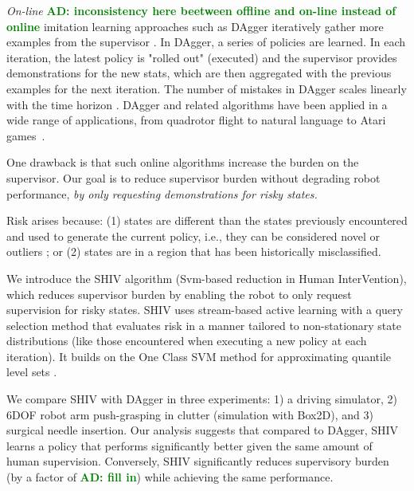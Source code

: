 \documentclass[10pt, conference]{ieeeconf}      %
\newcommand{\adnote}[1]{\ifthenelse{\boolean{include-notes}}%
 {\textcolor{green}{\textbf{AD: #1}}}{}}
\begin{document}
\emph{On-line}\adnote{inconsistency here beetween offline and on-line instead of online} imitation learning approaches such as DAgger iteratively gather more examples from the supervisor \cite{grollman2007dogged,ross2010efficient,ross2010reduction}. In DAgger, a series of policies are learned.  In each iteration, the latest policy is "rolled out" (executed) and the supervisor provides demonstrations for the  new stats, which are then aggregated with the previous examples for the next iteration. The number of mistakes in DAgger scales linearly with the time horizon \cite{ross2010efficient}. DAgger and related algorithms have been applied in a wide range of applications, from quadrotor flight to natural language to Atari games~\cite{NIPS2014_5421,duvallet2013imitation,ross2013learning}.

One drawback is that such online algorithms increase the burden on the supervisor. Our goal is to reduce supervisor burden without degrading robot performance, \emph{by only requesting demonstrations for risky states. }

Risk arises because:  (1) states are different than the states previously encountered and used to generate the current policy, i.e., they can be considered novel or outliers \cite{hodge2004survey}; or (2) states are in a region that  has been historically misclassified. 

We introduce the SHIV algorithm (Svm-based reduction in Human InterVention), which reduces supervisor burden by enabling the robot to only request supervision for risky states. SHIV uses stream-based active learning with a query selection method that evaluates risk in a manner tailored to non-stationary state distributions (like those encountered when executing a new policy at each iteration). It builds on the One Class SVM method for approximating quantile level sets \cite{scholkopf2001estimating}.

We compare SHIV with DAgger in three experiments: 1) a driving simulator, 2) 6DOF robot arm push-grasping in clutter (simulation with Box2D), and 3) surgical needle insertion. Our analysis suggests that compared to DAgger, SHIV learns a policy that performs significantly better given the same amount of human supervision. Conversely, SHIV significantly reduces supervisory burden (by a factor of \adnote{fill in}) while achieving the same performance. 
\end{document}
